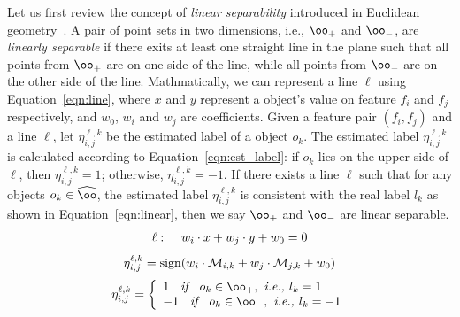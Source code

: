 Let us first review the concept of {\em linear separability} introduced in Euclidean geometry~\cite{shamos1975geometric}. A pair of point sets in two dimensions, i.e., $\oo_+$ and $\oo_-$, are \emph{linearly separable} if there exits at least one straight line in the plane such that all points from $\oo_+$ are on one side of the line, while all points from $\oo_-$ are on the other side of the line. Mathmatically, we can represent a line $\ell$ using Equation~\ref{eqn:line}, where $x$ and $y$ represent a object's value on feature $f_i$ and $f_j$ respectively, and $w_0$, $w_i$ and $w_j$ are coefficients. Given a feature pair $(f_i,f_j)$ and a line $\ell$, let $\eta_{i,j}^{\ell,k}$ be the estimated label of a object $o_k$. The estimated label $\eta_{i,j}^{\ell,k}$ is calculated according to Equation~\ref{eqn:est_label}: if $o_k$ lies on the upper side of $\ell$, then $\eta_{i,j}^{\ell,k}=1$; otherwise, $\eta_{i,j}^{\ell,k}=-1$.   
If there exists a line $\ell$ such that for any objects $o_k\in \widehat{\oo}$, the estimated label $\eta_{i,j}^{\ell,k}$ is consistent with the real label $l_k$ as shown in Equation~\ref{eqn:linear}, then we say $\oo_+$ and $\oo_-$ are linear separable. 
\begin{equation}\label{eqn:line}
\begin{split}
\ell: \hspace{4mm} w_i\cdot x + w_j\cdot y +w_0 =0 
\end{split}
\end{equation}
\begin{equation}\label{eqn:est_label}
\eta_{i,j}^{\ell,k}=\sign(w_i\cdot \mm_{i,k} + w_j\cdot \mm_{j,k} +w_0)
\end{equation}
\begin{equation}\label{eqn:linear}
\eta_{i,j}^{\ell,k} = \left\{
                \begin{array}{ll}
                  1 \textit{\hspace{2mm} if \hspace{2mm}} o_k\in \oo_+, \textit{ i.e., } l_k=1 \\
                  -1 \textit{\hspace{2mm} if \hspace{2mm}} o_k\in \oo_-, \textit{ i.e., } l_k=-1 
                \end{array}
              \right.
\end{equation}




